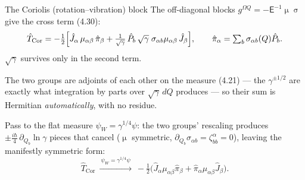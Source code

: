 \documentclass[aspectratio=169,10pt]{beamer}
\newcommand{\Mmu}{\upmu}        %
\newcommand{\Msig}{\upsigma}    %
\newcommand{\stagenum}{0}
\newcommand{\setstage}[1]{\renewcommand{\stagenum}{#1}}
\begin{document}
\begin{frame}{The Coriolis (rotation--vibration) block}
\setstage{3}
The off-diagonal blocks $g^{\Omega Q}=-\mathsf E^{-1}\Mmu\Msig$ give the cross term (4.30):
\begin{equation*}
\hat T_{\mathrm{Cor}}=-\tfrac12\Bigl[\hat J_\alpha\,\mu_{\alpha\beta}\,\hat\pi_\beta
+\tfrac{1}{\sqrt\gamma}\,\hat P_b\,\sqrt\gamma\;\sigma_{\alpha b}\mu_{\alpha\beta}\,\hat J_\beta\Bigr],\qquad \hat\pi_\alpha=\textstyle\sum_b\sigma_{\alpha b}(Q)\hat P_b .
\end{equation*}
\alert{$\sqrt\gamma$ survives only in the second term}.%

The two groups are \alert{adjoints of each other} on the measure (4.21) --- the $\gamma^{\pm1/2}$ are exactly what integration by parts over $\sqrt\gamma\,dQ$ produces --- so their sum is Hermitian \emph{automatically}, with no residue.

Pass to the flat measure $\psi_W=\gamma^{1/4}\psi$: the two groups' rescaling produces $\pm\tfrac{i\hbar}{4}\,\partial_{Q_b}\!\ln\gamma$ pieces that \alert{cancel} ($\Mmu$ symmetric, $\partial_{Q_b}\sigma_{\alpha b}=\zeta^{\alpha}_{bb}=0$), leaving the manifestly symmetric form:
\begin{equation*}
\hat T_{\mathrm{Cor}}\ \xrightarrow{\ \psi_W=\gamma^{1/4}\psi\ }\ -\tfrac12\bigl(\hat J_\alpha\mu_{\alpha\beta}\hat\pi_\beta+\hat\pi_\alpha\mu_{\alpha\beta}\hat J_\beta\bigr). \tag{4.35}
\end{equation*}
\end{frame}
\end{document}
